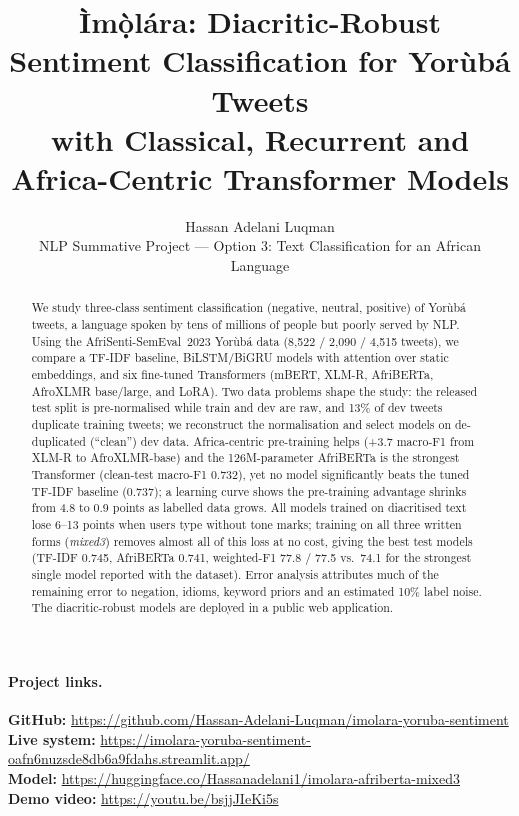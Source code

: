 \documentclass[11pt]{article}
\title{Ìmọ̀lára: Diacritic-Robust Sentiment Classification for Yorùbá Tweets\\with Classical, Recurrent and Africa-Centric Transformer Models}
\author{Hassan Adelani Luqman \\
  NLP Summative Project — Option 3: Text Classification for an African Language}
\begin{document}
\maketitle

\begin{abstract}
We study three-class sentiment classification (negative, neutral, positive) of Yorùbá tweets, a language spoken by tens of millions of people but poorly served by NLP. Using the AfriSenti-SemEval~2023 Yorùbá data (8,522 / 2,090 / 4,515 tweets), we compare a TF-IDF baseline, BiLSTM/BiGRU models with attention over static embeddings, and six fine-tuned Transformers (mBERT, XLM-R, AfriBERTa, AfroXLMR base/large, and LoRA). Two data problems shape the study: the released test split is pre-normalised while train and dev are raw, and 13\% of dev tweets duplicate training tweets; we reconstruct the normalisation and select models on de-duplicated (``clean'') dev data. Africa-centric pre-training helps (+3.7 macro-F1 from XLM-R to AfroXLMR-base) and the 126M-parameter AfriBERTa is the strongest Transformer (clean-test macro-F1 0.732), yet no model significantly beats the tuned TF-IDF baseline (0.737); a learning curve shows the pre-training advantage shrinks from 4.8 to 0.9 points as labelled data grows. All models trained on diacritised text lose 6--13 points when users type without tone marks; training on all three written forms (\emph{mixed3}) removes almost all of this loss at no cost, giving the best test models (TF-IDF 0.745, AfriBERTa 0.741, weighted-F1 77.8 / 77.5 vs.\ 74.1 for the strongest single model reported with the dataset). Error analysis attributes much of the remaining error to negation, idioms, keyword priors and an estimated 10\% label noise. The diacritic-robust models are deployed in a public web application.
\end{abstract}

\paragraph{Project links.}
\textbf{GitHub:} \url{https://github.com/Hassan-Adelani-Luqman/imolara-yoruba-sentiment} \\
\textbf{Live system:} \url{https://imolara-yoruba-sentiment-oafn6nuzsde8db6a9fdahs.streamlit.app/} \\
\textbf{Model:} \url{https://huggingface.co/Hassanadelani1/imolara-afriberta-mixed3} \\
\textbf{Demo video:} \url{https://youtu.be/bsjjJIeKi5s}
\end{document}
